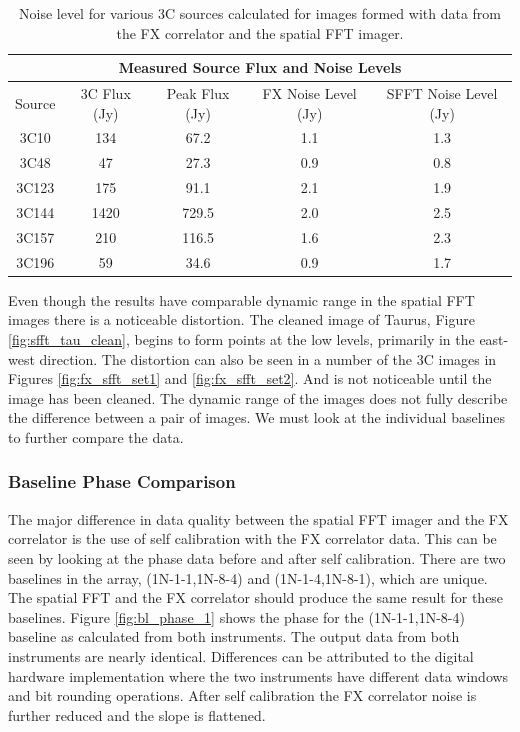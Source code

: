 \documentclass[useAMS,macros,usenatbib]{mn2e}
\begin{document}
\begin{table}
\begin{center}
\begin{tabular}{|c||c|c|c|c|}
\multicolumn{5}{|c|}{Measured Source Flux and Noise Levels}\\
\hline
Source & 3C Flux (Jy) & Peak Flux (Jy) & FX Noise Level (Jy) & SFFT Noise Level (Jy) \\ \hline
    3C10  &   134 &  67.2 & 1.1 & 1.3 \\
    3C48  &    47 &  27.3 & 0.9 & 0.8 \\
    3C123 &   175 &  91.1 & 2.1 & 1.9 \\
    3C144 &  1420 & 729.5 & 2.0 & 2.5 \\
    3C157 &   210 & 116.5 & 1.6 & 2.3 \\
    3C196 &    59 &  34.6 & 0.9 & 1.7 \\ \hline
\end{tabular}
\caption{Noise level for various 3C sources calculated for images formed with data from the FX correlator and the spatial FFT imager.}
\label{tbl:src_flux}
\end{center}
\end{table}

Even though the results have comparable dynamic range in the spatial FFT images there is a noticeable distortion.
The cleaned image of Taurus, Figure \ref{fig:sfft_tau_clean}, begins to form points at the low levels, primarily in the east-west direction.
The distortion can also be seen in a number of the 3C images in Figures \ref{fig:fx_sfft_set1} and \ref{fig:fx_sfft_set2}.
And is not noticeable until the image has been cleaned.
The dynamic range of the images does not fully describe the difference between a pair of images.
We must look at the individual baselines to further compare the data.

\subsubsection{Baseline Phase Comparison}
\label{fx_sfft_bl_comp}

The major difference in data quality between the spatial FFT imager and the FX correlator is the use of self calibration with the FX correlator data.
This can be seen by looking at the phase data before and after self calibration.
There are two baselines in the array, (1N-1-1,1N-8-4) and (1N-1-4,1N-8-1), which are unique.
The spatial FFT and the FX correlator should produce the same result for these baselines.
Figure \ref{fig:bl_phase_1} shows the phase for the (1N-1-1,1N-8-4) baseline as calculated from both instruments.
The output data from both instruments are nearly identical.
Differences can be attributed to the digital hardware implementation where the two instruments have different data windows and bit rounding operations.
After self calibration the FX correlator noise is further reduced and the slope is flattened.
\end{document}
